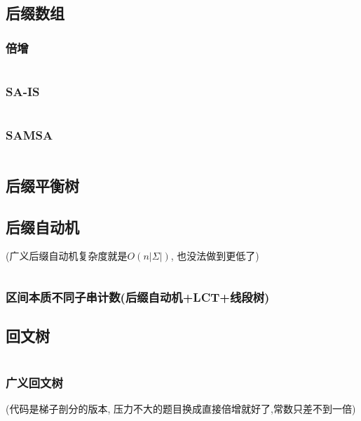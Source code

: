 \documentclass[a4paper, twoside]{article}
\begin{document}
\begin{multicols}{2}
			\subsection{后缀数组}
				\subsubsection{倍增}
					\inputminted{cpp}{../src/string/sa.cpp}	

				\subsubsection{SA-IS}
					\inputminted{cpp}{../src/string/sais.cpp}
			
				\subsubsection{SAMSA}
				 	\inputminted{cpp}{../src/string/SAMSA.cpp}

			\subsection{后缀平衡树}
				

			\subsection{后缀自动机}
				(广义后缀自动机复杂度就是$O\left(n\left|\Sigma\right|\right)$, 也没法做到更低了)
				\inputminted{cpp}{../src/string/后缀自动机.cpp}

				\subsubsection{区间本质不同子串计数(后缀自动机+LCT+线段树)}
					

			\subsection{回文树}
				\inputminted{cpp}{../src/string/回文树.cpp}

				\subsubsection{广义回文树}
					(代码是梯子剖分的版本, 压力不大的题目换成直接倍增就好了,常数只差不到一倍)
					\inputminted{cpp}{../src/string/广义回文树.cpp}




\end{multicols}
\end{document}
